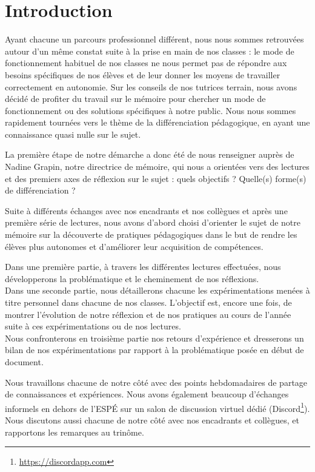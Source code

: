\section{Introduction} %

Ayant chacune un parcours professionnel différent, nous nous sommes retrouvées autour d’un même constat suite à la prise en main de nos classes : le mode de fonctionnement habituel de nos classes ne nous permet pas de répondre aux besoins spécifiques de nos élèves et de leur donner les moyens de travailler correctement en autonomie. Sur les conseils de nos tutrices terrain, nous avons décidé de profiter du travail sur le mémoire pour chercher un mode de fonctionnement ou des solutions spécifiques à notre public. Nous nous sommes rapidement tournées vers le thème de la différenciation pédagogique, en ayant une connaissance quasi nulle sur le sujet.

La première étape de notre démarche a donc été de nous renseigner auprès de Nadine Grapin, notre directrice de mémoire, qui nous a orientées vers des lectures et des premiers axes de réflexion sur le sujet : quels objectifs ? Quelle(s) forme(s) de différenciation ?

Suite à différents échanges avec nos encadrants et nos collègues et après une première série de lectures, nous avons d'abord choisi d’orienter le sujet de notre mémoire sur la découverte de pratiques pédagogiques dans le but de rendre les élèves plus autonomes et d'améliorer leur acquisition de compétences.

Dans une première partie, à travers les différentes lectures effectuées, nous développerons la problématique et le cheminement de nos réflexions. \\
Dans une seconde partie, nous détaillerons chacune les expérimentations menées à titre personnel dans chacune de nos classes. L'objectif est, encore une fois, de montrer l'évolution de notre réflexion et de nos pratiques au cours de l'année suite à ces expérimentations ou de nos lectures.\\
Nous confronterons en troisième partie nos retours d'expérience et dresserons un bilan de nos expérimentations par rapport à la problématique posée en début de document.

Nous travaillons chacune de notre côté avec des points hebdomadaires de partage de connaissances et expériences. Nous avons également beaucoup d’échanges informels en dehors de l’ESPÉ sur un salon de discussion virtuel dédié (Discord\footnote{\url{https://discordapp.com}}). Nous discutons aussi chacune de notre côté avec nos encadrants et collègues, et rapportons les remarques au trinôme.

